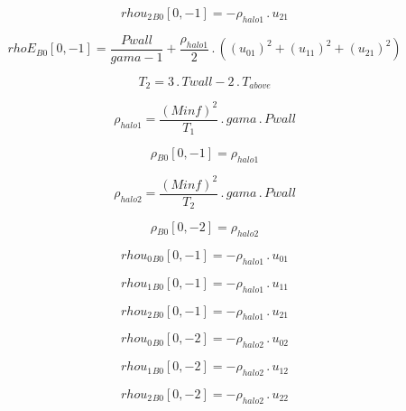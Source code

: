 \documentclass{article}
\begin{document}
\begin{dmath}{rhou_{2}{_{B0}}}[{0,-1}] = - \rho_{halo 1} \,.\, u_{21}\end{dmath}

\begin{dmath}{rhoE{_{B0}}}[{0,-1}] = \frac{Pwall}{gama - 1} + \frac{\rho_{halo 1}}{2} \,.\, \left(\left(u_{01} \right)^{2} + \left(u_{11} \right)^{2} + \left(u_{21} \right)^{2}\right)\end{dmath}

\begin{dmath}T_{2} = 3 \,.\, Twall - 2 \,.\, T_{above}\end{dmath}

\begin{dmath}\rho_{halo 1} = \frac{\left(Minf \right)^{2}}{T_{1}} \,.\, gama \,.\, Pwall\end{dmath}

\begin{dmath}{\rho{_{B0}}}[{0,-1}] = \rho_{halo 1}\end{dmath}

\begin{dmath}\rho_{halo 2} = \frac{\left(Minf \right)^{2}}{T_{2}} \,.\, gama \,.\, Pwall\end{dmath}

\begin{dmath}{\rho{_{B0}}}[{0,-2}] = \rho_{halo 2}\end{dmath}

\begin{dmath}{rhou_{0}{_{B0}}}[{0,-1}] = - \rho_{halo 1} \,.\, u_{01}\end{dmath}

\begin{dmath}{rhou_{1}{_{B0}}}[{0,-1}] = - \rho_{halo 1} \,.\, u_{11}\end{dmath}

\begin{dmath}{rhou_{2}{_{B0}}}[{0,-1}] = - \rho_{halo 1} \,.\, u_{21}\end{dmath}

\begin{dmath}{rhou_{0}{_{B0}}}[{0,-2}] = - \rho_{halo 2} \,.\, u_{02}\end{dmath}

\begin{dmath}{rhou_{1}{_{B0}}}[{0,-2}] = - \rho_{halo 2} \,.\, u_{12}\end{dmath}

\begin{dmath}{rhou_{2}{_{B0}}}[{0,-2}] = - \rho_{halo 2} \,.\, u_{22}\end{dmath}
\end{document}
